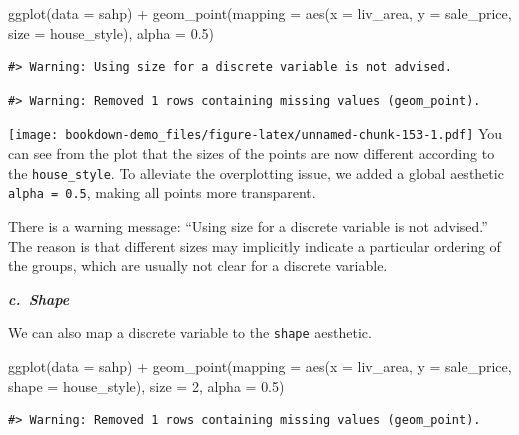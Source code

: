 \documentclass[
]{book}
\newenvironment{Shaded}{\begin{snugshade}}{\end{snugshade}}
\newcommand{\AttributeTok}[1]{\textcolor[rgb]{0.77,0.63,0.00}{#1}}
\newcommand{\DecValTok}[1]{\textcolor[rgb]{0.00,0.00,0.81}{#1}}
\newcommand{\FloatTok}[1]{\textcolor[rgb]{0.00,0.00,0.81}{#1}}
\newcommand{\FunctionTok}[1]{\textcolor[rgb]{0.00,0.00,0.00}{#1}}
\newcommand{\NormalTok}[1]{#1}
\newcommand{\SpecialCharTok}[1]{\textcolor[rgb]{0.00,0.00,0.00}{#1}}
\begin{document}
\begin{Shaded}
\begin{Highlighting}[]
\FunctionTok{ggplot}\NormalTok{(}\AttributeTok{data =}\NormalTok{ sahp) }\SpecialCharTok{+} \FunctionTok{geom\_point}\NormalTok{(}\AttributeTok{mapping =} \FunctionTok{aes}\NormalTok{(}\AttributeTok{x =}\NormalTok{ liv\_area, }\AttributeTok{y =}\NormalTok{ sale\_price, }\AttributeTok{size =}\NormalTok{ house\_style), }\AttributeTok{alpha =} \FloatTok{0.5}\NormalTok{)}
\end{Highlighting}
\end{Shaded}

\begin{verbatim}
#> Warning: Using size for a discrete variable is not advised.
\end{verbatim}

\begin{verbatim}
#> Warning: Removed 1 rows containing missing values (geom_point).
\end{verbatim}

\texttt{[image: bookdown-demo\_files/figure-latex/unnamed-chunk-153-1.pdf]}
You can see from the plot that the sizes of the points are now different according to the \texttt{house\_style}. To alleviate the overplotting issue, we added a global aesthetic \texttt{alpha\ =\ 0.5}, making all points more transparent.

There is a warning message: ``Using size for a discrete variable is not advised.'' The reason is that different sizes may implicitly indicate a particular ordering of the groups, which are usually not clear for a discrete variable.

\textbf{\emph{c.~Shape}}

We can also map a discrete variable to the \texttt{shape} aesthetic.

\begin{Shaded}
\begin{Highlighting}[]
\FunctionTok{ggplot}\NormalTok{(}\AttributeTok{data =}\NormalTok{ sahp) }\SpecialCharTok{+} \FunctionTok{geom\_point}\NormalTok{(}\AttributeTok{mapping =} \FunctionTok{aes}\NormalTok{(}\AttributeTok{x =}\NormalTok{ liv\_area, }\AttributeTok{y =}\NormalTok{ sale\_price, }\AttributeTok{shape =}\NormalTok{ house\_style), }\AttributeTok{size =} \DecValTok{2}\NormalTok{, }\AttributeTok{alpha =} \FloatTok{0.5}\NormalTok{)}
\end{Highlighting}
\end{Shaded}

\begin{verbatim}
#> Warning: Removed 1 rows containing missing values (geom_point).
\end{verbatim}
\end{document}
